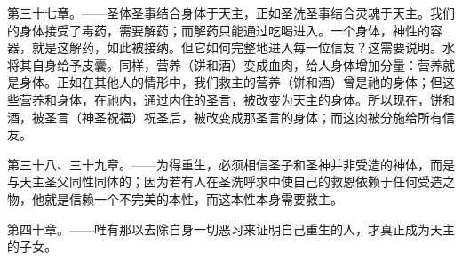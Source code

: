 第三十七章。——圣体圣事结合身体于天主，正如圣洗圣事结合灵魂于天主。我们的身体接受了毒药，需要解药；而解药只能通过吃喝进入。一个身体，神性的容器，就是这解药，如此被接纳。但它如何完整地进入每一位信友？这需要说明。水将其自身给予皮囊。同样，营养（饼和酒）变成血肉，给人身体增加分量：营养就是身体。正如在其他人的情形中，我们救主的营养（饼和酒）曾是祂的身体；但这些营养和身体，在祂内，通过内住的圣言，被改变为天主的身体。所以现在，饼和酒，被圣言（神圣祝福）祝圣后，被改变成那圣言的身体；而这肉被分施给所有信友。\par

第三十八、三十九章。——为得重生，必须相信圣子和圣神并非受造的神体，而是与天主圣父同性同体的；因为若有人在圣洗呼求中使自己的救恩依赖于任何受造之物，他就是信赖一个不完美的本性，而这本性本身需要救主。\par

第四十章。——唯有那以去除自身一切恶习来证明自己重生的人，才真正成为天主的子女。\par


